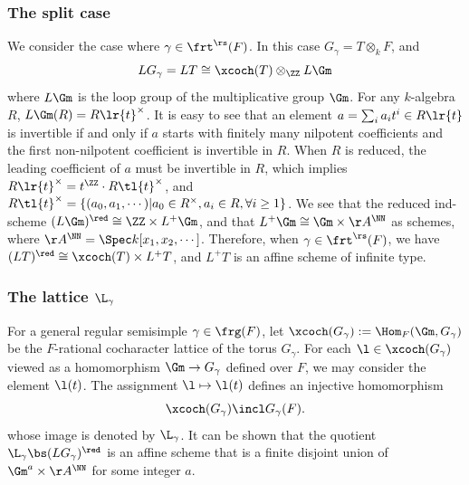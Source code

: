 \subsubsection{The split case} We consider the case where $\gamma\in\frt^{\rs}(F)$. In this case $G_{\gamma}=T\otimes_{k}F$, and
\begin{equation*}
LG_{\gamma}=LT\cong\xcoch(T)\otimes_{\ZZ}L\Gm
\end{equation*}
where $L\Gm$ is the loop group of the multiplicative group $\Gm$. For any $k$-algebra $R$, $L\Gm(R)=R\lr{t}^{\times}$. It is easy to see that an element $a=\sum_{i}a_{i}t^{i}\in R\lr{t}$ is invertible if and only if $a$ starts with finitely many nilpotent coefficients and the first non-nilpotent coefficient is invertible in $R$. When $R$ is reduced, the leading coefficient of $a$ must be invertible in $R$, which implies $R\lr{t}^{\times}=t^{\ZZ}\cdot R\tl{t}^{\times}$, and $R\tl{t}^{\times}=\{(a_{0},a_{1},\cdots)|a_{0}\in R^{\times}, a_{i}\in R, \forall i\geq 1\}$. We see that the reduced ind-scheme $(L\Gm)^{\red}\cong \ZZ\times L^{+}\Gm$, and that $L^{+}\Gm\cong \Gm\times\AA^{\NN}$ as schemes, where $\AA^{\NN}=\Spec k[x_{1},x_{2},\cdots]$. Therefore, when  $\gamma\in\frt^{\rs}(F)$, we have $(LT)^{\red}\cong\xcoch(T)\times L^{+}T$, and $L^{+}T$ is an affine scheme of infinite type.


\subsubsection{The lattice $\L_{\gamma}$}\label{sss:L gamma} For a general regular semisimple $\gamma\in\frg(F)$, let $\xcoch(G_{\gamma}):=\Hom_{F}(\Gm,G_{\gamma})$ be the $F$-rational cocharacter lattice of the torus $G_{\gamma}$. For each $\l\in\xcoch(G_{\gamma})$ viewed as a homomorphism $\Gm\to G_{\gamma}$ defined over $F$, we may consider the element $\l(t)$. The assignment $\l\mapsto \l(t)$ defines an injective homomorphism
\begin{equation*}
\xcoch(G_{\gamma})\incl G_{\gamma}(F).
\end{equation*}
whose image is denoted by $\L_{\gamma}$. It can be shown that the quotient $\L_{\gamma}\bs (LG_{\gamma})^{\red}$ is an affine scheme that is a finite disjoint union of $\Gm^{a}\times \AA^{\NN}$ for some integer $a$.




